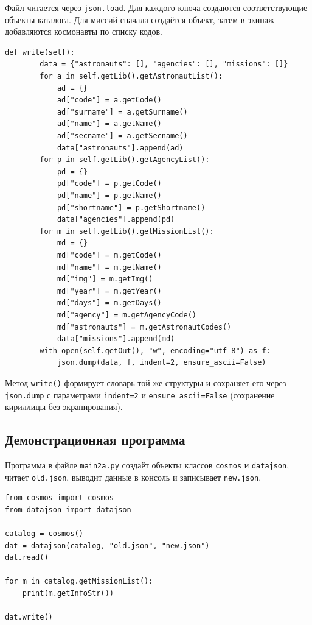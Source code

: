 \documentclass[a4paper,14pt]{extarticle}
\begin{document}
Файл читается через \texttt{json.load}. Для каждого ключа создаются соответствующие объекты каталога. Для миссий сначала создаётся объект, затем в экипаж добавляются космонавты по списку кодов.

\begin{lstlisting}[caption={Модуль \texttt{datajson.py}: метод \texttt{write()}}]
    def write(self):
        data = {"astronauts": [], "agencies": [], "missions": []}
        for a in self.getLib().getAstronautList():
            ad = {}
            ad["code"] = a.getCode()
            ad["surname"] = a.getSurname()
            ad["name"] = a.getName()
            ad["secname"] = a.getSecname()
            data["astronauts"].append(ad)
        for p in self.getLib().getAgencyList():
            pd = {}
            pd["code"] = p.getCode()
            pd["name"] = p.getName()
            pd["shortname"] = p.getShortname()
            data["agencies"].append(pd)
        for m in self.getLib().getMissionList():
            md = {}
            md["code"] = m.getCode()
            md["name"] = m.getName()
            md["img"] = m.getImg()
            md["year"] = m.getYear()
            md["days"] = m.getDays()
            md["agency"] = m.getAgencyCode()
            md["astronauts"] = m.getAstronautCodes()
            data["missions"].append(md)
        with open(self.getOut(), "w", encoding="utf-8") as f:
            json.dump(data, f, indent=2, ensure_ascii=False)
\end{lstlisting}

Метод \texttt{write()} формирует словарь той же структуры и сохраняет его через \texttt{json.dump} с параметрами \texttt{indent=2} и \texttt{ensure\_ascii=False} (сохранение кириллицы без экранирования).

\subsection{Демонстрационная программа}

Программа в файле \texttt{main2a.py} создаёт объекты классов \texttt{cosmos} и \texttt{datajson}, читает \texttt{old.json}, выводит данные в консоль и записывает \texttt{new.json}.

\begin{lstlisting}[caption={Модуль \texttt{main2a.py}}]
from cosmos import cosmos
from datajson import datajson

catalog = cosmos()
dat = datajson(catalog, "old.json", "new.json")
dat.read()

for m in catalog.getMissionList():
    print(m.getInfoStr())

dat.write()
\end{lstlisting}
\end{document}
